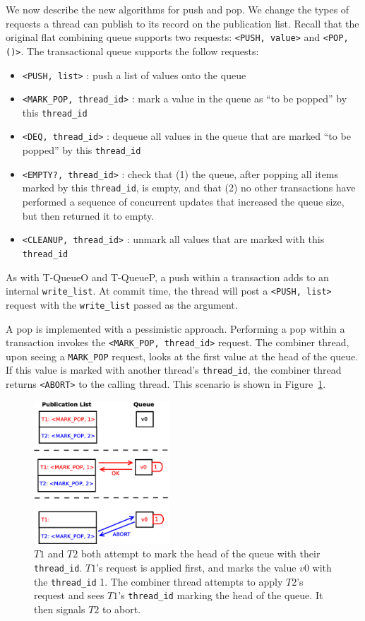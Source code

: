 We now describe the new algorithms for push and pop.  We change the types of requests a thread can publish to its record on the publication list. Recall that the original flat combining queue supports two requests: \texttt{<PUSH, value>} and \texttt{<POP, ()>}. The transactional queue supports the follow requests:
\begin{itemize}
    \item \texttt{<PUSH, list>} : push a list of values onto the queue
    \item \texttt{<MARK\_POP, thread\_id>} : mark a value in the queue as ``to be popped'' by this \texttt{thread\_id}
    \item \texttt{<DEQ, thread\_id>} : dequeue all values in the queue that are marked ``to be popped'' by this \texttt{thread\_id}
    \item \texttt{<EMPTY?, thread\_id>} : check that (1) the queue, after popping all items marked by this \texttt{thread\_id}, is empty, and that (2) no other transactions have performed a sequence of concurrent updates that increased the queue size, but then returned it to empty.
    \item \texttt{<CLEANUP, thread\_id>} : unmark all values that are marked with this \texttt{thread\_id}
\end{itemize}

As with T-QueueO and T-QueueP, a push within a transaction adds to an internal \texttt{write\_list}. At commit time, the thread will post a \texttt{<PUSH, list>} request with the \texttt{write\_list} passed as the argument.

A pop is implemented with a pessimistic approach. Performing a pop within a transaction invokes the \texttt{<MARK\_POP, thread\_id>} request. The combiner thread, upon seeing a \texttt{MARK\_POP} request, looks at the first value at the head of the queue. If this value is marked with another thread's \texttt{thread\_id}, the combiner thread returns \texttt{<ABORT>} to the calling thread. This scenario is shown in Figure~\ref{fig:fcqueue_abort1}.

\begin{figure}[t]
\centering
\includegraphics[width=0.45\textwidth]{fcqueue_abort1}
    \caption[Abort when performing conflicting pop requests]{$T1$ and $T2$ both attempt to mark the head of the queue with their \texttt{thread\_id}. $T1$'s request is applied first, and marks the value $v0$ with the \texttt{thread\_id} 1. The combiner thread attempts to apply $T2$'s request and sees $T1$'s \texttt{thread\_id} marking the head of the queue. It then signals $T2$ to abort.}
\label{fig:fcqueue_abort1}
\end{figure}

